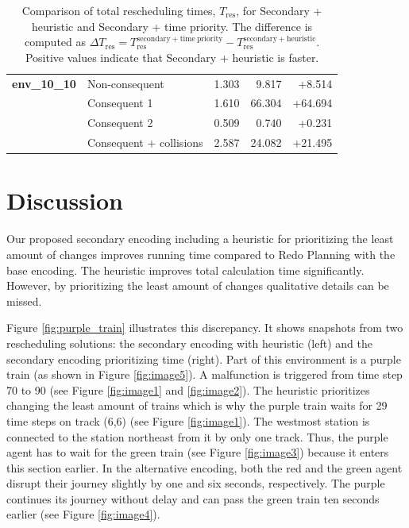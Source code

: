 \documentclass[runningheads]{llncs}
\begin{document}
\begin{table}[htbp]
\begin{tabular}{@{}llrrr@{}}
		\midrule
		
		\textbf{env\_10\_10}
		& Non-consequent & 1.303 & 9.817 & +8.514 \\
		& Consequent 1 & 1.610 & 66.304 & +64.694 \\
		& Consequent 2 & 0.509 & 0.740 & +0.231 \\
		& Consequent + collisions & 2.587 & 24.082 & +21.495 \\
		
		\bottomrule
	\end{tabular}
	\vspace{4mm}
	\caption{Comparison of total rescheduling times, $T_{\mathrm{res}}$, for
		Secondary + heuristic and Secondary + time priority. The difference is
		computed as
		$\Delta T_{\mathrm{res}} =
		T_{\mathrm{res}}^{\mathrm{secondary+time\ priority}} -
		T_{\mathrm{res}}^{\mathrm{secondary+heuristic}}$.
		Positive values indicate that Secondary + heuristic is faster.}
	\label{tab:rescheduling_time_priority}
\end{table}


\section{Discussion}

Our proposed secondary encoding including a heuristic for prioritizing the least amount of changes improves running time compared to Redo Planning with the base encoding. The heuristic improves total calculation time significantly. However, by prioritizing the least amount of changes qualitative details can be missed.

Figure \ref{fig:purple_train} illustrates this discrepancy. It shows snapshots from two rescheduling solutions: the secondary encoding with heuristic (left) and the secondary encoding prioritizing time (right). Part of this environment is a purple train (as shown in Figure \ref{fig:image5}). A malfunction is triggered from time step 70 to 90 (see Figure \ref{fig:image1} and \ref{fig:image2}). The heuristic prioritizes changing the least amount of trains which is why the purple train waits for 29 time steps on track (6,6) (see Figure \ref{fig:image1}). The westmost station is connected to the station northeast from it by only one track. Thus, the purple agent has to wait for the green train (see Figure \ref{fig:image3}) because it enters this section earlier.
In the alternative encoding, both the red and the green agent disrupt their journey slightly by one and six seconds, respectively. The purple continues its journey without delay and can pass the green train ten seconds earlier (see Figure \ref{fig:image4}).
\end{document}
